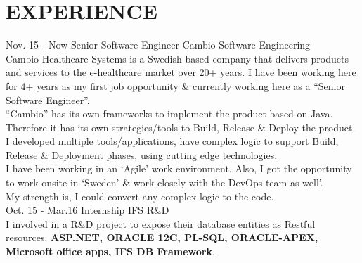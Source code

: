 \documentclass[]{cv-class}
\begin{document}
\section{EXPERIENCE}
\begin{entrylist}
  \entry
    {Nov. 15 - Now}
    {Senior Software Engineer}
    {Cambio Software Engineering}
    {   \\
        Cambio Healthcare Systems is a Swedish based company that delivers products and services to the e-healthcare market over 20+ years.
        I have been working here for 4+ years as my first job opportunity \& currently working here as a “Senior Software Engineer”.
        \\
        “Cambio” has its own frameworks to implement the product based on Java.
        Therefore it has its own strategies/tools to Build, Release \& Deploy the product.
        I developed multiple tools/applications, have complex logic to support Build, Release \& Deployment phases, using cutting edge technologies.
        \\
        I have been working in an ‘Agile’ work environment.
        Also, I got the opportunity to work onsite in ‘Sweden’ \& work closely with the DevOps team as well’.
        \\
        My strength is, I could convert any complex logic to the code.
    }
\\
  \entry
    {Oct. 15 - Mar.16}
    {Internship}
    {IFS R\&D}
    {   \\
        I involved in a R\&D project to expose their database entities as Restful resources.
        \textbf{ASP.NET, ORACLE 12C, PL-SQL, ORACLE-APEX, Microsoft office apps, IFS DB Framework}.
    }
\end{entrylist}
\end{document}
